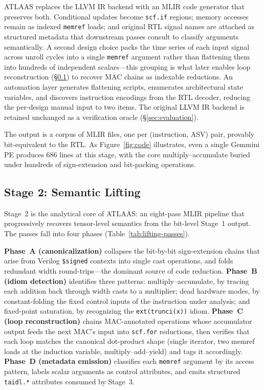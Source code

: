 ATLAAS replaces the LLVM IR backend with an MLIR code generator that preserves both.
Conditional updates become \texttt{scf.if} regions; memory accesses remain as indexed \texttt{memref} loads; and original RTL signal names are attached as structured metadata that downstream passes consult to classify arguments semantically.
A second design choice packs the time series of each input signal across unroll cycles into a single \texttt{memref} argument rather than flattening them into hundreds of independent scalars---this grouping is what later enables loop reconstruction (\S\ref{subsec:stage2}) to recover MAC chains as indexable reductions.
An automation layer generates flattening scripts, enumerates architectural state variables, and discovers instruction encodings from the RTL decoder, reducing the per-design manual input to two items.
The original LLVM IR backend is retained unchanged as a verification oracle (\S\ref{sec:evaluation}).

The output is a corpus of MLIR files, one per (instruction, ASV) pair, provably bit-equivalent to the RTL.
As Figure~\ref{fig:code} illustrates, even a single Gemmini PE produces 686 lines at this stage, with the core multiply--accumulate buried under hundreds of sign-extension and bit-packing operations.

\subsection{Stage 2: Semantic Lifting}
\label{subsec:stage2}

Stage~2 is the analytical core of ATLAAS: an eight-pass MLIR pipeline that progressively recovers tensor-level semantics from the bit-level Stage~1 output.
The passes fall into four phases (Table~\ref{tab:lifting-passes}).

\textbf{Phase~A (canonicalization)} collapses the bit-by-bit sign-extension chains that arise from Verilog \texttt{\$signed} contexts into single cast operations, and folds redundant width round-trips---the dominant source of code reduction.
\textbf{Phase~B (idiom detection)} identifies three patterns: multiply--accumulate, by tracing each addition back through width casts to a multiplier; dead hardware modes, by constant-folding the fixed control inputs of the instruction under analysis; and fixed-point saturation, by recognizing the \texttt{ext(trunci(x))} idiom.
\textbf{Phase~C (loop reconstruction)} chains MAC-annotated operations whose accumulator output feeds the next MAC's input into \texttt{scf.for} reductions, then verifies that each loop matches the canonical dot-product shape (single iterator, two memref loads at the induction variable, multiply--add--yield) and tags it accordingly.
\textbf{Phase~D (metadata emission)} classifies each \texttt{memref} argument by its access pattern, labels scalar arguments as control attributes, and emits structured \texttt{taidl.*} attributes consumed by Stage~3.

